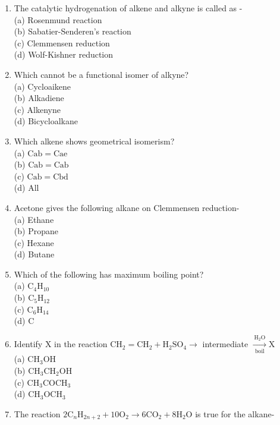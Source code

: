 \documentclass[10pt]{article}
\begin{document}
\begin{enumerate}
  \item The catalytic hydrogenation of alkene and alkyne is called as -\\
(a) Rosenmund reaction\\
(b) Sabatier-Senderen's reaction\\
(c) Clemmensen reduction\\
(d) Wolf-Kishner reduction
  \item Which cannot be a functional isomer of alkyne?\\
(a) Cycloaikene\\
(b) Alkadiene\\
(c) Alkenyne\\
(d) Bicycloalkane
  \item Which alkene shows geometrical isomerism?\\
(a) $\mathrm{Cab}=\mathrm{Cae}$\\
(b) $\mathrm{Cab}=\mathrm{Cab}$\\
(c) $\mathrm{Cab}=\mathrm{Cbd}$\\
(d) All
  \item Acetone gives the following alkane on Clemmensen reduction-\\
(a) Ethane\\
(b) Propane\\
(c) Hexane\\
(d) Butane
  \item Which of the following has maximum boiling point?\\
(a) $\mathrm{C}_{4} \mathrm{H}_{10}$\\
(b) $\mathrm{C}_{5} \mathrm{H}_{12}$\\
(c) $\mathrm{C}_{6} \mathrm{H}_{14}$\\
(d) C
  \item Identify X in the reaction $\mathrm{CH}_{2}=\mathrm{CH}_{2}+\mathrm{H}_{2} \mathrm{SO}_{4} \longrightarrow$ intermediate $\xrightarrow[\text { boil }]{\mathrm{H}_{2} \mathrm{O}} \mathrm{X}$\\
(a) $\mathrm{CH}_{3} \mathrm{OH}$\\
(b) $\mathrm{CH}_{3} \mathrm{CH}_{2} \mathrm{OH}$\\
(c) $\mathrm{CH}_{3} \mathrm{COCH}_{3}$\\
(d) $\mathrm{CH}_{3} \mathrm{OCH}_{3}$
  \item The reaction $2 \mathrm{C}_{n} \mathrm{H}_{2 n+2}+10 \mathrm{O}_{2} \rightarrow 6 \mathrm{CO}_{2}+8 \mathrm{H}_{2} \mathrm{O}$ is true for the alkane-\\

\end{enumerate}
\end{document}
